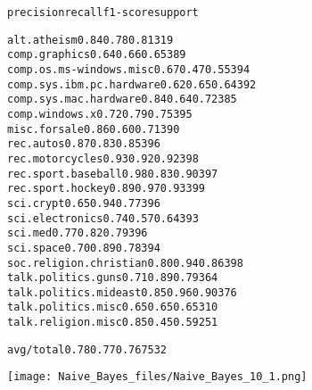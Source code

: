\documentclass[letterpaper,10pt,english]{/usr/local/lib/python3.4/dist-packages/sphinx/texinputs/sphinxhowto}
\newenvironment{InvisibleVerbatim}
        {\begin{mdframed}[leftmargin=0.1\linewidth,innerleftmargin=3pt,innerrightmargin=3pt, userdefinedwidth=1\linewidth, linewidth=0pt, linecolor=white, usetwoside=false]}
        {\end{mdframed}}
\begin{document}
    

        
        

            
                \begin{InvisibleVerbatim}
                \vspace{-0.5\baselineskip}
\begin{alltt}                          precision    recall  f1-score   support

             alt.atheism       0.84      0.78      0.81       319
           comp.graphics       0.64      0.66      0.65       389
 comp.os.ms-windows.misc       0.67      0.47      0.55       394
comp.sys.ibm.pc.hardware       0.62      0.65      0.64       392
   comp.sys.mac.hardware       0.84      0.64      0.72       385
          comp.windows.x       0.72      0.79      0.75       395
            misc.forsale       0.86      0.60      0.71       390
               rec.autos       0.87      0.83      0.85       396
         rec.motorcycles       0.93      0.92      0.92       398
      rec.sport.baseball       0.98      0.83      0.90       397
        rec.sport.hockey       0.89      0.97      0.93       399
               sci.crypt       0.65      0.94      0.77       396
         sci.electronics       0.74      0.57      0.64       393
                 sci.med       0.77      0.82      0.79       396
               sci.space       0.70      0.89      0.78       394
  soc.religion.christian       0.80      0.94      0.86       398
      talk.politics.guns       0.71      0.89      0.79       364
   talk.politics.mideast       0.85      0.96      0.90       376
      talk.politics.misc       0.65      0.65      0.65       310
      talk.religion.misc       0.85      0.45      0.59       251

             avg / total       0.78      0.77      0.76      7532

\end{alltt}

            \end{InvisibleVerbatim}
            
                \begin{InvisibleVerbatim}
                \vspace{-0.5\baselineskip}
    \begin{center}
    \texttt{[image: Naive\_Bayes\_files/Naive\_Bayes\_10\_1.png]}
    \par
    \end{center}
    
            \end{InvisibleVerbatim}
            
\end{document}
